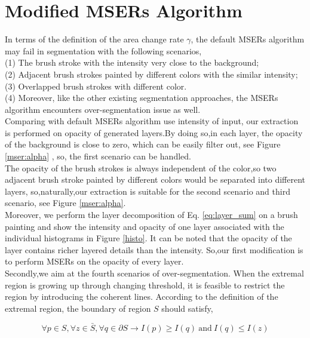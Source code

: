\section{Modified MSERs Algorithm}\label{modimesr}

In terms of the definition of the area change rate $ \gamma $, the default MSERs algorithm may fail in segmentation with the following scenarios,\\
(1) The brush stroke with the intensity very close to the background; \\
(2) Adjacent brush strokes painted by different colors with the similar intensity;\\
(3) Overlapped brush strokes with different color.\\ 
(4) Moreover, like the other existing segmentation approaches, the MSERs algorithm encounters over-segmentation issue as well. \\
Comparing with default MSERs algorithm use intensity of input, our extraction is performed on opacity of generated layers.By doing so,in each layer, the opacity of the background is close to zero, which can be easily filter out, see Figure \ref{mser:alpha} , so, the first scenario can be handled. \\
The opacity of the brush strokes is always independent of the color,so two adjacent brush stroke painted by different colors would be separated into different layers, so,naturally,our extraction is suitable for the second scenario and third scenario, see Figure \ref{mser:alpha}. \\
Moreover, we perform the layer decomposition of Eq. \ref{eq:layer_sum} on a brush painting and show the intensity and opacity of one layer associated with the individual histograms in Figure \ref{histo}. It can be noted that the opacity of the layer contains richer layered details than the intensity. So,our first modification is to perform MSERs on the opacity of every layer.\\
Secondly,we aim at the fourth scenarios of over-segmentation. When the extremal region is growing up through changing threshold, it is feasible to restrict the region by introducing the coherent lines. According to the definition of the extremal region, the boundary of region $S$ should satisfy,

\begin{equation*}
 \forall p \in S,\forall z \in   \bar{S} , \forall q \in \partial S \longrightarrow I(p) \geq I(q)  ~\mathrm{and}~  I(q) \leq I(z)
\end{equation*}
 
